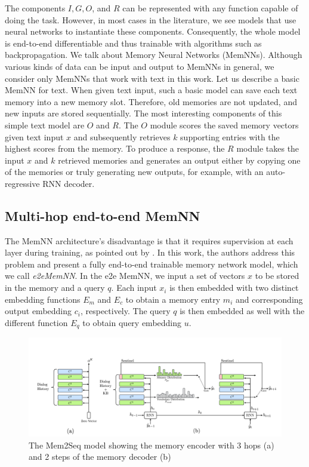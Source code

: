 The components $I, G, O$, and $R$ can be represented with any function capable of doing the task.
However, in most cases in the literature, we see models that use neural networks to instantiate these components.
Consequently, the whole model is end-to-end differentiable and thus trainable with algorithms such as backpropagation.
We talk about Memory Neural Networks (MemNNs).
Although various kinds of data can be input and output to MemNNs in general, we consider only MemNNs that work with text in this work.
Let us describe a basic MemNN for text.
When given text input, such a basic model can save each text memory into a new memory slot.
Therefore, old memories are not updated, and new inputs are stored sequentially.
The most interesting components of this simple text model are $O$ and $R$.
The $O$ module scores the saved memory vectors given text input $x$ and subsequently retrieves $k$ supporting entries with the highest scores from the memory.
To produce a response, the $R$ module takes the input $x$ and $k$ retrieved memories and generates an output either by copying one of the memories or truly generating new outputs, for example, with an auto-regressive RNN decoder. 

\subsection{Multi-hop end-to-end MemNN}
The MemNN architecture's disadvantage is that it requires supervision at each layer during training, as pointed out by \citet{sukhbaatar2015end}.
In this work, the authors address this problem and present a fully end-to-end trainable memory network model, which we call \emph{e2eMemNN}.
In the e2e MemNN, we input a set of vectors $x$ to be stored in the memory and a query $q$.
Each input $x_i$ is then embedded with two distinct embedding functions $E_m$ and $E_c$ to obtain a memory entry $m_i$ and corresponding output embedding $c_i$, respectively.
The query $q$ is then embedded as well with the different function $E_q$ to obtain query embedding $u$.

\begin{figure}[t]
    \centering
    \includegraphics[width=\textwidth]{images/mem2seq.png}
    \caption{The Mem2Seq model \cite{madotto-etal-2018-mem2seq} showing the memory encoder with 3 hops (a) and 2 steps of the memory decoder (b) }
    \label{fig:mem2seq}
\end{figure}

